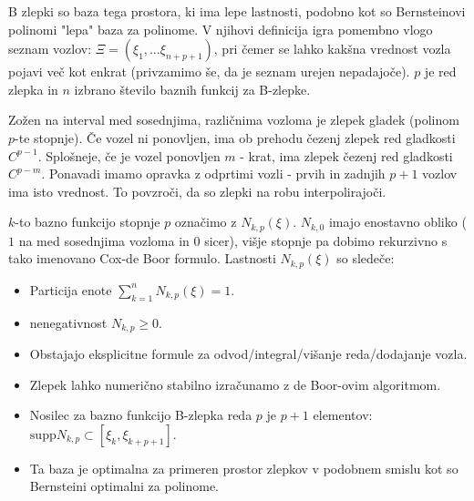 \documentclass{article}
\begin{document}
B zlepki so baza tega prostora, ki ima lepe lastnosti, podobno kot so Bernsteinovi polinomi "lepa" baza za polinome.
V njihovi definicija igra pomembno vlogo seznam vozlov: $\Xi = ( \xi_1, \dots \xi_{n+p+1} )$, pri čemer se lahko kakšna vrednost vozla pojavi več kot enkrat (privzamimo še, da je seznam urejen nepadajoče). $p$ je red zlepka in $n$ izbrano število baznih funkcij za B-zlepke.

Zožen na interval med sosednjima, različnima vozloma je zlepek gladek (polinom $p$-te stopnje). Če vozel ni ponovljen, ima ob prehodu čezenj zlepek red gladkosti $C^{p-1}$. Splošneje, če je vozel ponovljen $m$ - krat, ima zlepek čezenj red gladkosti $C^{p-m}$. 
Ponavadi imamo opravka z odprtimi vozli - prvih in zadnjih $p+1$ vozlov ima isto vrednost. To povzroči, da so zlepki na robu interpolirajoči.

$k$-to bazno funkcijo stopnje $p$ označimo z $N_{k,p}(\xi)$. $N_{k,0}$ imajo enostavno obliko ($1$ na med sosednjima vozloma in $0$ sicer), višje stopnje pa dobimo rekurzivno s tako imenovano Cox-de Boor formulo.
Lastnosti $N_{k,p}(\xi)$ so sledeče:
\begin{itemize}
\item Particija enote $\sum_{k=1}^n N_{k,p}(\xi) = 1$.
\item nenegativnost $N_{k,p} \geq 0$.
\item Obstajajo eksplicitne formule za odvod/integral/višanje reda/dodajanje vozla.
\item Zlepek lahko numerično stabilno izračunamo z de Boor-ovim algoritmom.
\item Nosilec za bazno funkcijo B-zlepka reda $p$ je $p+1$ elementov: $\mathrm{supp} N_{k,p} \subset [\xi_k,\xi_{k+p+1}]$.
\item Ta baza je optimalna za primeren prostor zlepkov v podobnem smislu kot so Bernsteini optimalni za polinome.
\end{itemize}
\end{document}
